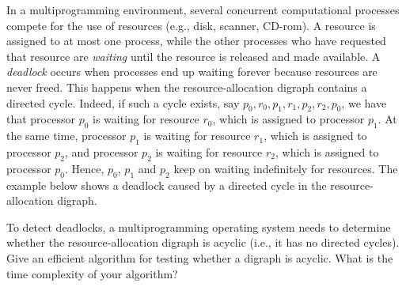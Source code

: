 In a multiprogramming environment, several concurrent computational
processes compete for the use of resources (e.g., disk, scanner,
CD-rom).  A resource is assigned to at most one process, while the
other processes who have requested that resource are {\em waiting}
until the resource is released and made available.  A {\em deadlock}
occurs when processes end up waiting forever because resources are
never freed.  This happens when the resource-allocation digraph
contains a directed cycle.  Indeed, if such a cycle exists, say
$p_0,r_0,p_1,r_1,p_2,r_2,p_0$, we have that processor $p_0$ is
waiting for resource $r_0$, which is assigned to processor $p_1$.  At
the same time, processor $p_1$ is waiting for resource $r_1$, which is
assigned to processor $p_2$, and processor $p_2$ is waiting for
resource $r_2$, which is assigned to processor $p_0$.  Hence, $p_0$,
$p_1$ and $p_2$ keep on waiting indefinitely for resources.  The
example below shows a deadlock caused by a directed cycle in the
resource-allocation digraph.  

 \vspace{4mm} \par
\begin{figure}[h]
\centerline{}\end{figure}
 \par
\vspace{4mm}

To detect deadlocks, a multiprogramming operating system needs to
determine whether the resource-allocation digraph is acyclic (i.e., it
has no directed cycles).  Give an efficient algorithm for testing
whether a digraph is acyclic.  What is the time complexity of your algorithm?
